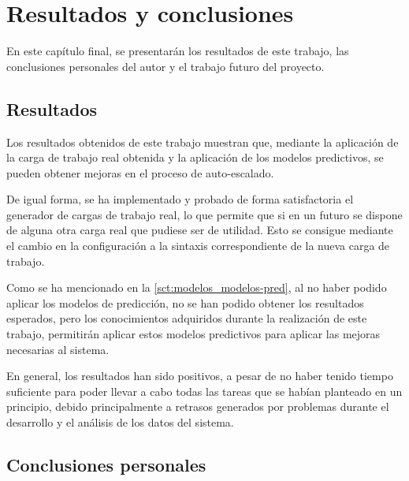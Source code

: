 \chapter{Resultados y conclusiones} \label{chp:resultados}

En este capítulo final, se presentarán los resultados de este trabajo, 
las conclusiones personales del autor y el trabajo futuro del proyecto.


\section{Resultados} \label{sct:resultados_resultados}

Los resultados obtenidos de este trabajo muestran que, mediante la aplicación 
de la carga de trabajo real obtenida y la aplicación de los modelos
predictivos, se pueden obtener mejoras en el proceso de auto-escalado.

De igual forma, se ha implementado y probado de forma satisfactoria el generador
de cargas de trabajo real, lo que permite que si en un futuro se dispone de 
alguna otra carga real que pudiese ser de utilidad. Esto se consigue mediante 
el cambio en la configuración a la sintaxis correspondiente de la nueva carga 
de trabajo.

Como se ha mencionado en la \autoref{sct:modelos_modelos-pred}, al no haber 
podido aplicar los modelos de predicción, no se han podido obtener los 
resultados esperados, pero los conocimientos adquiridos durante la realización
de este trabajo, permitirán aplicar estos modelos predictivos para aplicar las
mejoras necesarias al sistema.

En general, los resultados han sido positivos, a pesar de no haber tenido tiempo
suficiente para poder llevar a cabo todas las tareas que se habían planteado en
un principio, debido principalmente a retrasos generados por problemas durante
el desarrollo y el análisis de los datos del sistema.



\section{Conclusiones personales} \label{sct:resultados_conclusiones}

